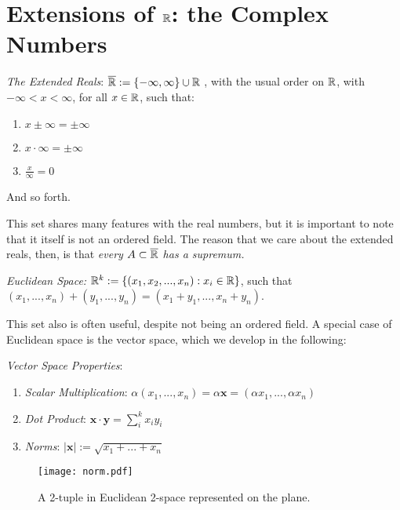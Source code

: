 \section{Extensions of $\mathbb{R}$: the Complex Numbers \C}

\begin{definition}
	\emph{The Extended Reals}: $\overline{\mathbb{R}}:=\{-\infty ,\infty\}\cup \mathbb{R}$ , with the usual order on $\mathbb{R}$, with $-\infty <x<\infty$, for all $x\in\mathbb{R}$, such that: 
    
    \begin{enumerate}
	    \item $x\pm \infty = \pm \infty$
        \item $x\cdot\infty = \pm\infty$
        \item $\frac{x}{\infty}=0$


	\end{enumerate}
    And so forth.
    \end{definition}
    
This set shares many features with the real numbers, but it is important to note that it itself is not an ordered field. The reason that we care about the extended reals, then, is that \emph{every $A\subset \overline{\mathbb{R}}$ has a supremum.}

\begin{definition}
	\emph{Euclidean Space:} $\mathbb{R}^k := \{(x_1,x_2,...,x_n):x_i \in \mathbb{R}\}$, such that $(x_1,...,x_n)+(y_1,...,y_n)=(x_1+y_1,...,x_n+y_n)$.  
\end{definition}

This set also is often useful, despite not being an ordered field. A special case of Euclidean space is the vector space, which we develop in the following:

\begin{definition} \emph{Vector Space Properties}:
	\begin{enumerate}
	    \item \emph{Scalar Multiplication}: $\alpha(x_1,...,x_n)=\alpha\mathbf{x}=(\alpha x_1, ..., \alpha x_n)$
        \item \emph{Dot Product}: $\mathbf{x} \cdot \mathbf{y} = \sum ^k_i x_iy_i$
        \item \emph{Norms}: $|\mathbf{x}|:=\sqrt{x_1 + ... + x_n}$
	\end{enumerate}
  
\end{definition}
\begin{figure}
    \centering
    \texttt{[image: norm.pdf]}
    \caption{A 2-tuple in Euclidean 2-space represented on the plane.}
    \label{fig:enter-label}
\end{figure}



